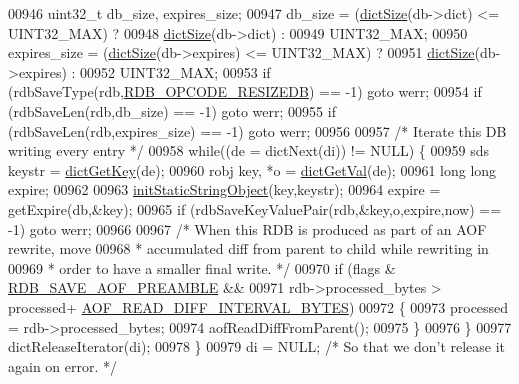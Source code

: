\begin{DoxyCode}
{{{{{{{{{00946         uint32\_t db\_size, expires\_size;
00947         db\_size = (\hyperlink{dict_8h_af193430dd3d5579a52b194512f72c1f0}{dictSize}(db->dict) <= UINT32\_MAX) ?
00948                                 \hyperlink{dict_8h_af193430dd3d5579a52b194512f72c1f0}{dictSize}(db->dict) :
00949                                 UINT32\_MAX;
00950         expires\_size = (\hyperlink{dict_8h_af193430dd3d5579a52b194512f72c1f0}{dictSize}(db->expires) <= UINT32\_MAX) ?
00951                                 \hyperlink{dict_8h_af193430dd3d5579a52b194512f72c1f0}{dictSize}(db->expires) :
00952                                 UINT32\_MAX;
00953         \textcolor{keywordflow}{if} (rdbSaveType(rdb,\hyperlink{rdb_8h_ad1f63cee59a3066446beecae389a8758}{RDB\_OPCODE\_RESIZEDB}) == -1) \textcolor{keywordflow}{goto} werr;
00954         \textcolor{keywordflow}{if} (rdbSaveLen(rdb,db\_size) == -1) \textcolor{keywordflow}{goto} werr;
00955         \textcolor{keywordflow}{if} (rdbSaveLen(rdb,expires\_size) == -1) \textcolor{keywordflow}{goto} werr;
00956 
00957         \textcolor{comment}{/* Iterate this DB writing every entry */}
00958         \textcolor{keywordflow}{while}((de = dictNext(di)) != NULL) \{
00959             sds keystr = \hyperlink{dict_8h_a3271c334309904a3086deca94f96e46e}{dictGetKey}(de);
00960             robj key, *o = \hyperlink{dict_8h_ae8d2cc391873b2bea2b87c4f80f43120}{dictGetVal}(de);
00961             \textcolor{keywordtype}{long} \textcolor{keywordtype}{long} expire;
00962 
00963             \hyperlink{server_8h_abb4d561af9c6476a52e9236bcae5408d}{initStaticStringObject}(key,keystr);
00964             expire = getExpire(db,&key);
00965             \textcolor{keywordflow}{if} (rdbSaveKeyValuePair(rdb,&key,o,expire,now) == -1) \textcolor{keywordflow}{goto} werr;
00966 
00967             \textcolor{comment}{/* When this RDB is produced as part of an AOF rewrite, move}
00968 \textcolor{comment}{             * accumulated diff from parent to child while rewriting in}
00969 \textcolor{comment}{             * order to have a smaller final write. */}
00970             \textcolor{keywordflow}{if} (flags & \hyperlink{rdb_8h_a0bafda4fc4a08ebf980ba8e2a1bd3b78}{RDB\_SAVE\_AOF\_PREAMBLE} &&
00971                 rdb->processed\_bytes > processed+
      \hyperlink{server_8h_a0044e793bf429aa6921aa7924a2b62e5}{AOF\_READ\_DIFF\_INTERVAL\_BYTES})
00972             \{
00973                 processed = rdb->processed\_bytes;
00974                 aofReadDiffFromParent();
00975             \}
00976         \}
00977         dictReleaseIterator(di);
00978     \}
00979     di = NULL; \textcolor{comment}{/* So that we don't release it again on error. */}
}}}}}}}}}
\end{DoxyCode}
